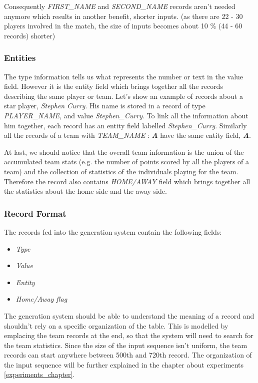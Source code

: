 Consequently \emph{FIRST\_NAME} and \emph{SECOND\_NAME} records aren't needed anymore which results in another benefit, shorter inputs. (as there are 22 - 30 players involved in the match, the size of inputs becomes about 10 \% (44 - 60 records) shorter)

\subsubsection{Entities}

The type information tells us what represents the number or text in the value field. However it is the entity field which brings together all the records describing the same player or team. Let's show an example of records about a star player, \emph{Stephen Curry}. His name is stored in a record of type \emph{PLAYER\_NAME}, and value \emph{Stephen\_Curry}. To link all the information about him together, each record has an entity field labelled \emph{Stephen\_Curry}. Similarly all the records of a team with \emph{TEAM\_NAME} : \emph{\textbf{A}} have the same entity field, \emph{\textbf{A}}.

At last, we should notice that the overall team information is the union of the accumulated team stats (e.g. the number of points scored by all the players of a team) and the collection of statistics of the individuals playing for the team. Therefore the record also contains \emph{HOME/AWAY} field which brings together all the statistics about the home side and the away side.

\subsubsection{Record Format}

The records fed into the generation system contain the following fields:

\begin{itemize}
    \item \emph{Type}
    \item \emph{Value}
    \item \emph{Entity}
    \item \emph{Home/Away flag}
\end{itemize}

The generation system should be able to understand the meaning of a record and shouldn't rely on a specific organization of the table. This is modelled by emplacing the team records at the end, so that the system will need to search for the team statistics. Since the size of the input sequence isn't uniform, the team records can start anywhere between 500th and 720th record. The organization of the input sequence will be further explained in the chapter about experiments \ref{experiments_chapter}.


